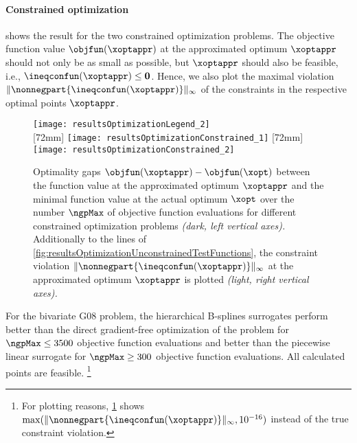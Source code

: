\paragraph{Constrained optimization}

shows the result for the two constrained optimization problems.
The objective function value $\objfun(\xoptappr)$
at the approximated optimum $\xoptappr$ should not only
be as small as possible, but $\xoptappr$ should also be feasible, i.e.,
$\ineqconfun(\xoptappr) \le \*0$.
Hence, we also plot the maximal violation
$\norm[\infty]{\nonnegpart{\ineqconfun(\xoptappr)}}$
of the constraints in the respective optimal points $\xoptappr$.

\begin{figure}
  \texttt{[image: resultsOptimizationLegend\_2]}\\[2mm]%
  [72mm]{%
    \texttt{[image: resultsOptimizationConstrained\_1]}%
  }%
  \hfill%
  [72mm]{%
    \texttt{[image: resultsOptimizationConstrained\_2]}%
  }%
  \caption[Optimality gaps for different objective functions (constrained)]{%
    Optimality gaps $\objfun(\xoptappr) - \objfun(\xopt)$ between
    the function value at the approximated optimum $\xoptappr$ and
    the minimal function value at the actual optimum $\xopt$
    over the number $\ngpMax$ of objective function evaluations
    for different constrained optimization problems
    \emph{(dark, left vertical axes).}
    Additionally to the lines of
    \cref{fig:resultsOptimizationUnconstrainedTestFunctions},
    the constraint violation
    $\norm[\infty]{\nonnegpart{\ineqconfun(\xoptappr)}}$
    at the approximated optimum $\xoptappr$ is plotted
    \emph{(light, right vertical axes).}%
  }%
  \label{fig:resultsOptimizationConstrainedTestFunctions}%
\end{figure}

For the bivariate G08 problem, the hierarchical B-splines surrogates
perform better than the direct gradient-free optimization of the problem
for $\ngpMax \le 3500$ objective function evaluations
and better than the piecewise linear surrogate for $\ngpMax \ge 300$
objective function evaluations.
All calculated points are feasible.%
\footnote{%
  For plotting reasons,
  \cref{fig:resultsOptimizationConstrainedTestFunctions} shows
  $\max(\norm[\infty]{\nonnegpart{\ineqconfun(\xoptappr)}}, 10^{-16})$
  instead of the true constraint violation.%
}

